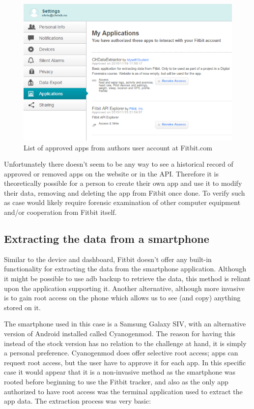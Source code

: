 \documentclass[a4paper,11pt,dvips]{article}
\begin{document}
\begin{figure}
\noindent
\includegraphics[natwidth=624bp,natheight=409bp,width=\linewidth]{apisettings}
\caption{List of approved apps from authors user account at Fitbit.com}
\label{fig:apisettings}
\end{figure}

Unfortunately there doesn't seem to be any way to see a historical record of approved or removed apps on the website or in the API. Therefore it is theoretically possible for a person to create their own app and use it to modify their data, removing and deleting the app from Fitbit once done. To verify such as case would likely require forensic examination of other computer equipment and/or cooperation from Fitbit itself.


\subsection{Extracting the data from a smartphone}

Similar to the device and dashboard, Fitbit doesn't offer any built-in functionality for extracting the data from the smartphone application. Although it might be possible to use adb backup to retrieve the data, this method is reliant upon the application supporting it. Another alternative, although more invasive is to gain root access on the phone which allows us to see (and copy) anything stored on it.

The smartphone used in this case is a Samsung Galaxy SIV, with an alternative version of Android installed called Cyanogenmod. The reason for having this instead of the stock version has no relation to the challenge at hand, it is simply a personal preference. Cyanogenmod does offer selective root access; apps can request root access, but the user have to approve it for each app. In this specific case it would appear that it is a non-invasive method as the smartphone was rooted before beginning to use the Fitbit tracker, and also as the only app authorized to have root access was the terminal application used to extract the app data. The extraction process was very basic:
\end{document}
